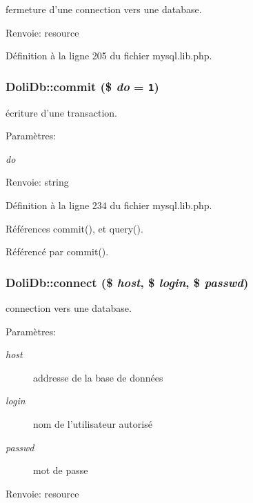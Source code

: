 fermeture d'une connection vers une database. 

\begin{Desc}
\item[Renvoie:]resource \end{Desc}


D\'{e}finition \`{a} la ligne 205 du fichier mysql.lib.php.\hypertarget{classDoliDb_a8}{
\subsubsection[commit]{\setlength{\rightskip}{0pt plus 5cm}Doli\-Db::commit (\$ {\em do} = {\tt 1})}}
\label{classDoliDb_a8}


\'{e}criture d'une transaction. 

\begin{Desc}
\item[Param\`{e}tres:]
\begin{description}
\item[{\em do}]\end{description}
\end{Desc}
\begin{Desc}
\item[Renvoie:]string \end{Desc}


D\'{e}finition \`{a} la ligne 234 du fichier mysql.lib.php.

R\'{e}f\'{e}rences commit(), et query().

R\'{e}f\'{e}renc\'{e} par commit().\hypertarget{classDoliDb_a2}{
\subsubsection[connect]{\setlength{\rightskip}{0pt plus 5cm}Doli\-Db::connect (\$ {\em host}, \$ {\em login}, \$ {\em passwd})}}
\label{classDoliDb_a2}


connection vers une database. 

\begin{Desc}
\item[Param\`{e}tres:]
\begin{description}
\item[{\em host}]addresse de la base de donn\'{e}es \item[{\em login}]nom de l'utilisateur autoris\'{e} \item[{\em passwd}]mot de passe \end{description}
\end{Desc}
\begin{Desc}
\item[Renvoie:]resource \end{Desc}


